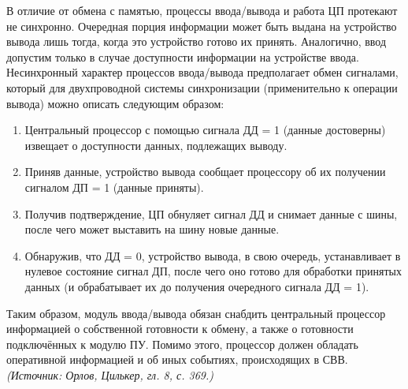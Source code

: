 \documentclass[a4paper,12pt]{article}
\begin{document}
В отличие от обмена с памятью, процессы ввода/вывода и работа ЦП протекают не синхронно. Очередная порция информации может быть выдана на устройство вывода лишь тогда, когда это устройство готово их принять. Аналогично, ввод допустим только в случае доступности информации на устройстве ввода. Несинхронный характер процессов ввода/вывода предполагает обмен сигналами, который для двухпроводной системы синхронизации (применительно к операции вывода) можно описать следующим образом:
\begin{enumerate}[label=\arabic*)]
\item Центральный процессор с помощью сигнала ДД = 1 (данные достоверны) извещает о доступности данных, подлежащих выводу.
\item Приняв данные, устройство вывода сообщает процессору об их получении сигналом ДП = 1 (данные приняты).
\item Получив подтверждение, ЦП обнуляет сигнал ДД и снимает данные с шины, после чего может выставить на шину новые данные.
\item Обнаружив, что ДД = 0, устройство вывода, в свою очередь, устанавливает в нулевое состояние сигнал ДП, после чего оно готово для обработки принятых данных (и обрабатывает их до получения очередного сигнала ДД = 1).
\end{enumerate}
Таким образом, модуль ввода/вывода обязан снабдить центральный процессор информацией о собственной готовности к обмену, а также о готовности подключённых к модулю ПУ. Помимо этого, процессор должен обладать оперативной информацией и об иных событиях, происходящих в СВВ.
\textit{(Источник: Орлов, Цилькер, гл. 8, с. 369.)}
\end{document}
